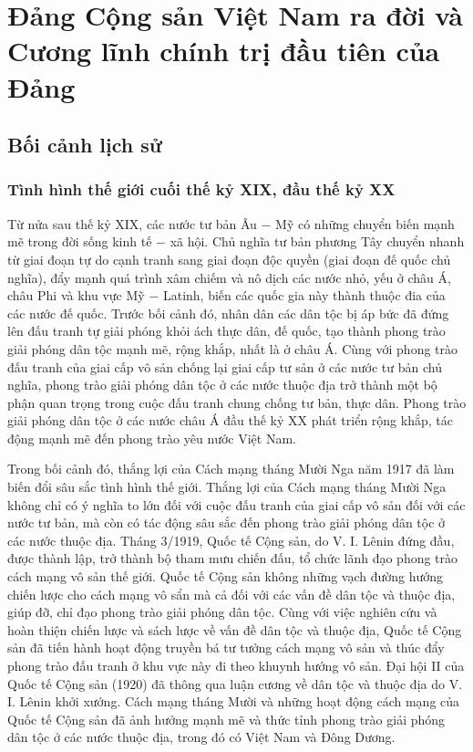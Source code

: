\section{Đảng Cộng sản Việt Nam ra đời và Cương lĩnh chính trị đầu tiên của Đảng}
\subsection{Bối cảnh lịch sử}
\subsubsection{Tình hình thế giới cuối thế kỷ XIX, đầu thế kỷ XX}
Từ nửa sau thế kỷ XIX, các nước tư bản Âu $-$ Mỹ có những chuyển biến mạnh mẽ trong đời sống kinh tế $-$ xã hội. Chủ nghĩa tư bản phương Tây chuyển nhanh từ giai đoạn tự do cạnh tranh sang giai đoạn độc quyền (giai đoạn đế quốc chủ nghĩa), đẩy mạnh quá trình xâm chiếm và nô dịch các nước nhỏ, yếu ở châu Á, châu Phi và khu vực Mỹ $-$ Latinh, biến các quốc gia này thành thuộc đia của các nước đế quốc. Trước bối cảnh đó, nhân dân các dân tộc bị áp bức đã đứng lên đấu tranh tự giải phóng khỏi ách thực dân, đế quốc, tạo thành phong trào giải phóng dân tộc mạnh mẽ, rộng khắp, nhất là ở châu Á. Cùng với phong trào đấu tranh của giai cấp vô sản chống lại giai cấp tư sản ở các nước tư bản chủ nghĩa, phong trào giải phóng dân tộc ở các nước thuộc địa trở thành một bộ phận quan trọng trong cuộc đấu tranh chung chống tư bản, thực dân. Phong trào giải phóng dân tộc ở các nước châu Á đầu thế kỷ XX phát triển rộng khắp, tác động mạnh mẽ đến phong trào yêu nước Việt Nam.

Trong bối cảnh đó, thắng lợi của Cách mạng tháng Mười Nga năm 1917 đã làm biến đổi sâu sắc tình hình thế giới. Thắng lợi của Cách mạng tháng Mười Nga không chỉ có ý nghĩa to lớn đối với cuộc đấu tranh của giai cấp vô sản đối với các nước tư bản, mà còn có tác động sâu sắc đến phong trào giải phóng dân tộc ở các nước thuộc địa. Tháng 3/1919, Quốc tế Cộng sản, do V. I. Lênin đứng đầu, được thành lập, trở thành bộ tham mưu chiến đấu, tổ chức lãnh đạo phong trào cách mạng vô sản thế giới. Quốc tế Cộng sản không những vạch đường hướng chiến lược cho cách mạng vô sẩn mà cả đối với các vấn đề dân tộc và thuộc địa, giúp đỡ, chỉ đạo phong trào giải phóng dân tộc. Cùng với việc nghiên cứu và hoàn thiện chiến lược và sách lược về vấn đề dân tộc và thuộc địa, Quốc tế Cộng sản đã tiến hành hoạt động truyền bá tư tưởng cách mạng vô sản và thúc đẩy phong trào đấu tranh ở khu vực này đi theo khuynh hướng vô sản. Đại hội II của Quốc tế Cộng sản (1920) đã thông qua luận cương về dân tộc và thuộc địa do V. I. Lênin khởi xướng. Cách mạng tháng Mười và những hoạt động cách mạng của Quốc tế Cộng sản đã ảnh hưởng mạnh mẽ và thức tỉnh phong trào giải phóng dân tộc ở các nước thuộc địa, trong đó có Việt Nam và Đông Dương.

